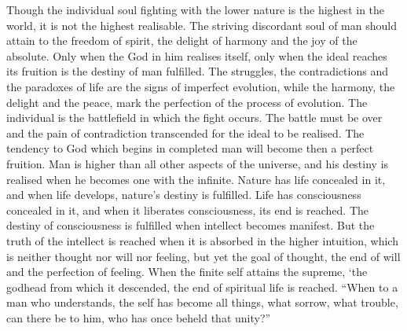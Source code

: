 \begin{quotex}
Though the individual soul fighting with the lower nature is the highest in the world, it is not the highest realisable. The striving discordant soul of man should attain to the freedom of spirit, the delight of harmony and the joy of the absolute. Only when the God in him realises itself, only when the ideal reaches its fruition is the destiny of man fulfilled. The struggles, the contradictions and the paradoxes of life are the signs of imperfect evolution, while the harmony, the delight and the peace, mark the perfection of the process of evolution. The individual is the battlefield in which the fight occurs. The battle must be over and the pain of contradiction transcended for the ideal to be realised. The tendency to God which begins in completed man will become then a perfect fruition. Man is higher than all other aspects of the universe, and his destiny is realised when he becomes one with the infinite. Nature has life concealed in it, and when life develops, nature's destiny is fulfilled. Life has consciousness concealed in it, and when it liberates consciousness, its end is reached. The destiny of consciousness is fulfilled when intellect becomes manifest. But the truth of the intellect is reached when it is absorbed in the higher intuition, which is neither thought nor will nor feeling, but yet the goal of thought, the end of will and the perfection of feeling. When the finite self attains the supreme, `the godhead from which it descended, the end of spiritual life is reached. ``When to a man who understands, the self has become all things, what sorrow, what trouble, can there be to him, who has once beheld that unity?''
\end{quotex}





